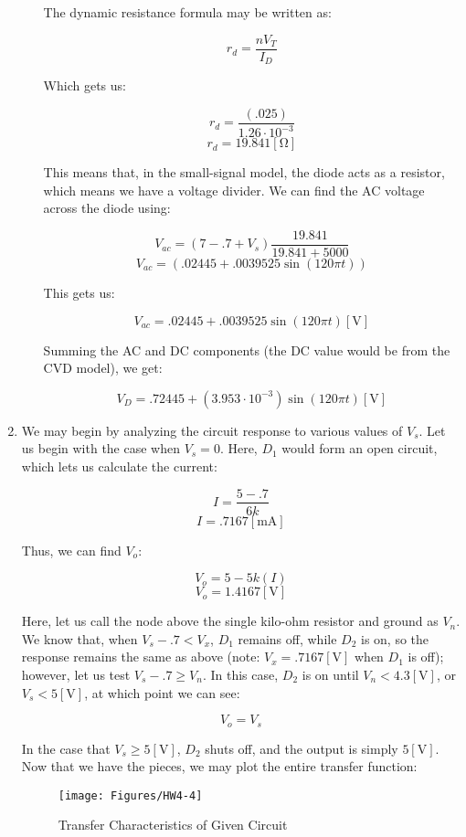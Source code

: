 \begin{enumerate}
\begin{enumerate}
        The dynamic resistance formula may be written as:

        $$r_d=\frac{nV_T}{I_D}$$

        Which gets us:

        $$r_d=\frac{(.025)}{1.26\cdot10^{-3}}$$
        $$\boxed{r_d=19.841[\si{\ohm}]}$$

        This means that, in the small-signal model, the diode acts as a resistor, which means we have a voltage divider. We can find the AC voltage across the diode using:

        $$V_{ac}=(7-.7+V_s)\frac{19.841}{19.841+5000}$$
        $$V_{ac}=(.02445+.0039525\sin(120\pi t))$$

        This gets us:

        $$\boxed{V_{ac}=.02445+.0039525\sin(120\pi t)[\si{\volt}]}$$

        Summing the AC and DC components (the DC value would be from the CVD model), we get:

        $$\boxed{V_D=.72445+\left( 3.953\cdot 10^{-3} \right)\sin(120\pi t)[\si{\volt}]}$$

    \end{enumerate}

  \item We may begin by analyzing the circuit response to various values of $V_s$. Let us begin with the case when $V_s=0$. Here, $D_1$ would form an open circuit, which lets us calculate the current:

    $$I=\frac{5-.7}{6k}$$
    $$I=.7167[\si{\milli\ampere}]$$

    Thus, we can find $V_o$:

    $$V_o=5-5k(I)$$
    $$\boxed{V_o=1.4167[\si{\volt}]}$$

    Here, let us call the node above the single kilo-ohm resistor and ground as $V_n$. We know that, when $V_s-.7<V_x$, $D_1$ remains off, while $D_2$ is on, so the response remains the same as above (note: $V_x=.7167[\si{\volt}]$ when $D_1$ is off); however, let us test $V_s-.7\geq V_n$. In this case, $D_2$ is on until $V_n<4.3[\si{\volt}]$, or $V_s<5[\si{\volt}]$, at which point we can see:

    $$V_o=V_s$$

    In the case that $V_s\geq 5[\si{\volt}]$, $D_2$ shuts off, and the output is simply $5[\si{\volt}]$. Now that we have the pieces, we may plot the entire transfer function:

    \begin{figure}[H]
      \centering
      \texttt{[image: Figures/HW4-4]}
      \caption{Transfer Characteristics of Given Circuit}
      \label{fig:10}
    \end{figure}


\end{enumerate}
